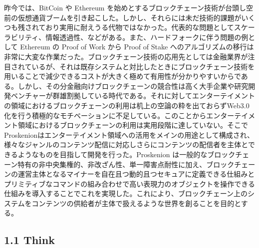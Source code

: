 昨今では、BitCoin や Ethereum
を始めとするブロックチェーン技術が台頭し空前の仮想通貨ブームを引き起こした。しかし、それらには未だ技術的課題がいくつも残されており実用に耐えうる代物ではなかった。代表的な問題としてスケーラビリティ、情報透過性、などがある。また、ハードフォークに伴う問題の例として
Ethereum の Proof of Work から Proof of Stake
へのアルゴリズムの移行は非常に大変な作業だった。ブロックチェーン技術の応用先としては金融業界が注目されているが、それは既存システムと対比したときにブロックチェーン技術を用いることで減少できるコストが大きく極めて有用性が分かりやすいからである。しかし、その分金融向けブロックチェーンの競合性は高く大手企業や研究開発ベンチャーが群雄割拠している時代である。それに対してエンターテイメントの領域におけるブロックチェーンの利用は机上の空論の粋を出ておらずWeb3.0化を行う積極的なモチベーションに不足している。このことからエンターテイメント領域におけるブロックチェーンの利用は実用段階に達していない。そこでProskenionはエンターテイメント領域への活用をメインの用途として構成され、様々なジャンルのコンテンツ配信に対応しさらにコンテンツの配信者を主体とできるようなものを目指して開発を行った。Proskenion
は一般的なブロックチェーン特有の非中央集権的、非改ざん性、単一障害点耐性に加え、ブロックチェーンの運営主体となるマイナーを自在且つ動的且つセキュアに定義できる仕組みとプリミティブなコマンドの組み合わせで高い表現力のオブジェクトを操作できる仕組みを導入することでこれを実現した。これにより、ブロックチェーン上のシステムをコンテンツの供給者が主体で扱えるような世界を創ることを目的とする。

\hypertarget{think}{%
\subsection{1.1 Think}\label{think}}

